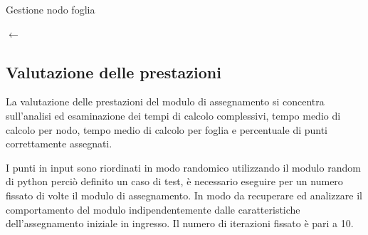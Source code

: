 \documentclass[a4paper,12pt]{report}
\begin{document}
  \begin{algorithm}[H]
  \caption{Gestione nodo foglia}\label{alg:gestione_nodo_foglia}
  \perm $\leftarrow$ \genPerm{\primo} \\
   {
     {
    }
  }
\end{algorithm}

\subsection{Valutazione delle prestazioni}
La valutazione delle prestazioni del modulo di assegnamento si concentra sull'analisi ed esaminazione dei tempi di calcolo complessivi, tempo medio di calcolo per nodo, tempo medio di calcolo per foglia e percentuale di punti correttamente assegnati.

I punti in input sono riordinati in modo randomico utilizzando il modulo random di python perciò definito un caso di test, è necessario eseguire per un numero fissato di volte il modulo di assegnamento. In modo da recuperare ed analizzare il comportamento del modulo indipendentemente dalle caratteristiche dell'assegnamento iniziale in ingresso. Il numero di iterazioni fissato è pari a 10.
\end{document}
